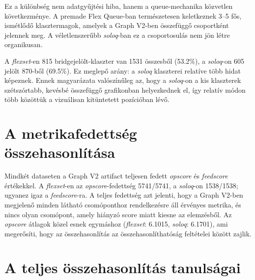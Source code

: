Ez a különbség nem adatgyűjtési hiba, hanem a queue-mechanika közvetlen következménye. A premade Flex Queue-ban természetesen keletkeznek 3--5 fős, ismétlődő klasztermagok, amelyek a Graph V2-ben összefüggő csoportként jelennek meg. A véletlenszerűbb \textit{soloq}-ban ez a csoportosulás nem jön létre organikusan.

A \textit{flexset}-en 815 bridgejelölt-klaszter van 1531 összesből (53.2\%), a \textit{soloq}-on 605 jelölt 870-ből (69.5\%). Ez meglepő arány: a \textit{soloq} klaszterei relatíve több hidat képeznek. Ennek magyarázata valószínűleg az, hogy a \textit{soloq}-on a kis klaszterek szétszórtabb, kevésbé összefüggő grafikonban helyezkednek el, így relatív módon több közöttük a vizuálisan kitüntetett pozícióban lévő.

\section{A metrikafedettség összehasonlítása}

Mindkét dataseten a Graph V2 artifact teljesen fedett \textit{opscore} és \textit{feedscore} értékekkel. A \textit{flexset}-en az \textit{opscore}-fedettség 5741/5741, a \textit{soloq}-on 1538/1538; ugyanez igaz a \textit{feedscore}-ra. A teljes fedettség azt jelenti, hogy a Graph V2-ben megjelenő minden látható csomóponthoz rendelkezésre áll érvényes metrika, és nincs olyan csomópont, amely hiányzó score miatt kiesne az elemzésből. Az \textit{opscore} átlagok közel esnek egymáshoz (\textit{flexset}: 6.1015, \textit{soloq}: 6.1701), ami megerősíti, hogy az összehasonlítás az összehasonlíthatóság feltételei között zajlik.

\section{A teljes összehasonlítás tanulságai}

